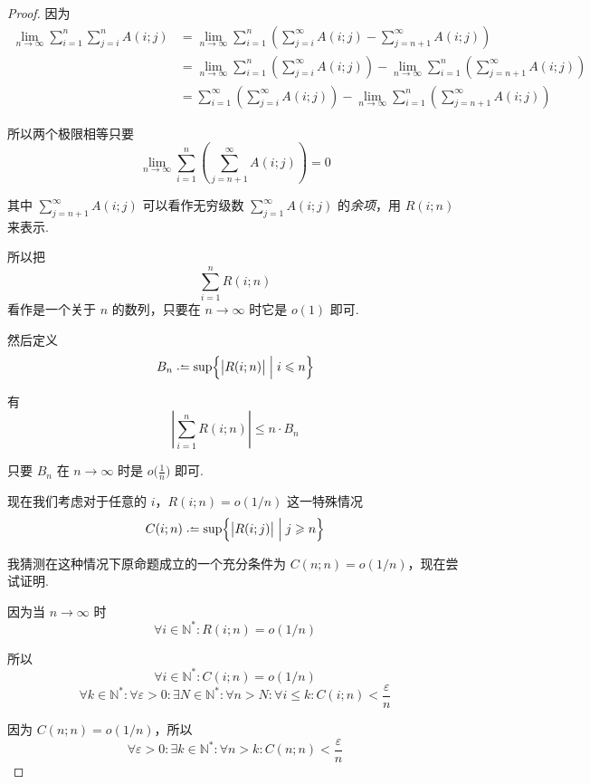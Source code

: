 \begin{proof}
    因为
    \begin{align*}
        \lim_{n \rightarrow \infty} \sum_{i=1}^{n}\sum_{j=i}^{n} A(i;j) &= \lim_{n \rightarrow \infty} \sum_{i=1}^{n} \left(\sum_{j=i}^{\infty} A(i;j) - \sum_{j=n+1}^{\infty} A(i;j)\right)\\
        &= \lim_{n \rightarrow \infty} \sum_{i=1}^{n} \left(\sum_{j=i}^{\infty} A(i;j)\right) - \lim_{n \rightarrow \infty} \sum_{i=1}^{n} \left(\sum_{j=n+1}^{\infty} A(i;j)\right)\\
        &= \sum_{i=1}^{\infty} \left(\sum_{j=i}^{\infty} A(i;j)\right) - \lim_{n \rightarrow \infty} \sum_{i=1}^{n} \left(\sum_{j=n+1}^{\infty} A(i;j)\right)
    \end{align*}
    
    所以两个极限相等只要
    \[\lim_{n \rightarrow \infty} \sum_{i=1}^{n} \left(\sum_{j=n+1}^{\infty} A(i;j)\right) = 0\]

    其中 $\displaystyle \sum_{j=n+1}^{\infty} A(i;j)$ 可以看作无穷级数 $\displaystyle \sum_{j=1}^{\infty} A(i;j)$ 的\emph{余项}，用 $R(i;n)$ 来表示.
    
    所以把
    \[\sum_{i=1}^{n} R(i;n)\]
    看作是一个关于 $n$ 的数列，只要在 $n \rightarrow \infty$ 时它是 $o(1)$ 即可.
    
    然后定义
    \[B_n \defeq \sup\Bigl\{\bigl| R(i;n)\bigr| \Bigm| i \leqslant n\Bigr\}\]
    
    有
    \[\left|\sum_{i=1}^{n} R(i;n)\right| \leqslant n \cdot B_n\]
    
    只要 $B_n$ 在 $n \rightarrow \infty$ 时是 $\displaystyle o\biggl(\frac{1}{n}\biggr)$ 即可.

    现在我们考虑对于任意的 $i$，$R(i;n) = o(1/n)$ 这一特殊情况
    \[C(i;n) \defeq \sup\Bigl\{ \bigl| R(i;j) \bigr| \Bigm| j \geqslant n\Bigr\}\]

    我猜测在这种情况下原命题成立的一个充分条件为 $C(n;n) = o(1/n)$，现在尝试证明.

    因为当 $n \rightarrow \infty$ 时
    \[\forall i \in \mathbb{N}^*: R(i;n) = o(1/n)\]

    所以
    \[\forall i \in \mathbb{N}^*: C(i;n) = o(1/n)\]
    \[\forall k \in \mathbb{N}^*: \forall \varepsilon > 0: \exists N \in \mathbb{N}^*: \forall n > N: \forall i \leqslant k: C(i;n) < \frac{\varepsilon}{n} \tag{1}\]

    因为 $C(n;n) = o(1/n)$，所以
    \[\forall \varepsilon > 0: \exists k \in \mathbb{N}^*: \forall n > k: C(n;n) < \frac{\varepsilon}{n} \tag{2}\]


\end{proof}
